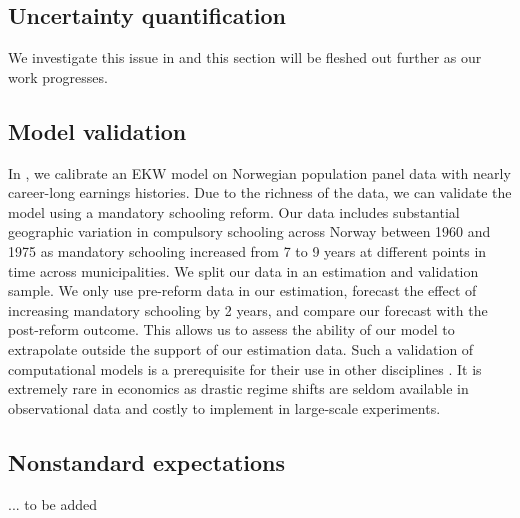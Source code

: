 \subsection{Uncertainty quantification}

We investigate this issue in \citet{Gabler.2020b} and this section will be fleshed out further as our work progresses.

\subsection{Model validation}

In \citet{Bhuller.2018}, we calibrate an EKW model on Norwegian population panel data with nearly career-long earnings histories. Due to the richness of the data, we can validate the model using a mandatory schooling reform. Our data includes substantial geographic variation in compulsory schooling across Norway between 1960 and 1975 as mandatory schooling increased from 7 to 9 years at different points in time across municipalities. We split our data in an estimation and validation sample. We only use pre-reform data in our estimation, forecast the effect of increasing mandatory schooling by 2 years, and compare our forecast with the post-reform outcome. This allows us to assess the ability of our model to extrapolate outside the support of our estimation data. Such a validation of computational models is a prerequisite for their use in other disciplines \citep{Adams.2012,Oberkampf.2010}. It is extremely rare in economics as drastic regime shifts are seldom available in observational data and costly to implement in large-scale experiments.
\subsection{Nonstandard expectations}
... to be added
